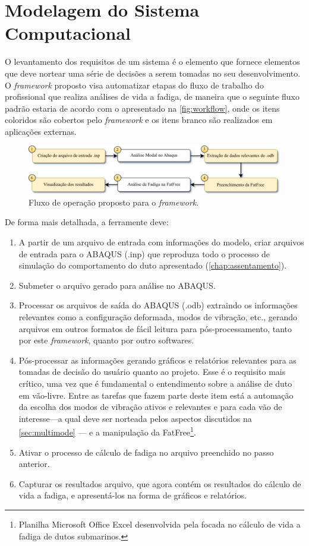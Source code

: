 \chapter{Modelagem do Sistema Computacional}\label{chap:software}

O levantamento dos requisitos de um sistema é o elemento que fornece elementos que deve nortear uma série de decisões a serem tomadas no seu desenvolvimento. O \textit{framework} proposto visa automatizar etapas do fluxo de trabalho do profissional que realiza análises de vida a fadiga, de maneira que o seguinte fluxo padrão estaria de acordo com o apresentado na \autoref{fig:workflow}, onde os itens coloridos são cobertos pelo \textit{framework} e os itens  branco são realizados em aplicações externas.

\begin{figure}[!ht]
    \centering
    \caption{Fluxo de operação proposto para o \textit{framework}.}\label{fig:workflow}
    \includegraphics[width=\textwidth]{imagens/fluxograma_automatizado}
\end{figure}

De forma mais detalhada, a ferramente deve:

\begin{enumerate}[label= (\arabic*)]
    \item A partir de um arquivo de entrada com informações do modelo, criar arquivos de entrada para o ABAQUS (.inp) que reproduza todo o processo de simulação do comportamento do duto apresentado (\autoref{chap:assentamento}).
    \item Submeter o arquivo gerado para análise no ABAQUS.
    \item Processar os arquivos de saída do ABAQUS (.odb) extraindo os informações relevantes como a configuração deformada, modos de vibração, etc., gerando arquivos em outros formatos de fácil leitura para pós-processamento, tanto por este \textit{framework}, quanto por outro softwares.
    \item Pós-processar as informações gerando gráficos e relatórios relevantes para as tomadas de decisão do usuário quanto ao projeto. Esse é o requisito mais crítico, uma vez que é fundamental o entendimento sobre a análise de duto em vão-livre. Entre as tarefas que fazem parte deste item está a automação da escolha dos modos de vibração ativos e relevantes e para cada vão de interesse---a qual deve ser norteada pelos aspectos discutidos na \autoref{sec:multimode} --- e a manipulação da FatFree\footnote{Planilha Microsoft Office Excel desenvolvida pela  focada no cálculo de vida a fadiga de dutos submarinos.}.
    \item Ativar o processo de cálculo de fadiga no arquivo preenchido no passo anterior.
    \item Capturar os resultados arquivo, que agora contém os resultados do cálculo de vida a fadiga, e apresentá-los na forma de gráficos e relatórios.
\end{enumerate}

